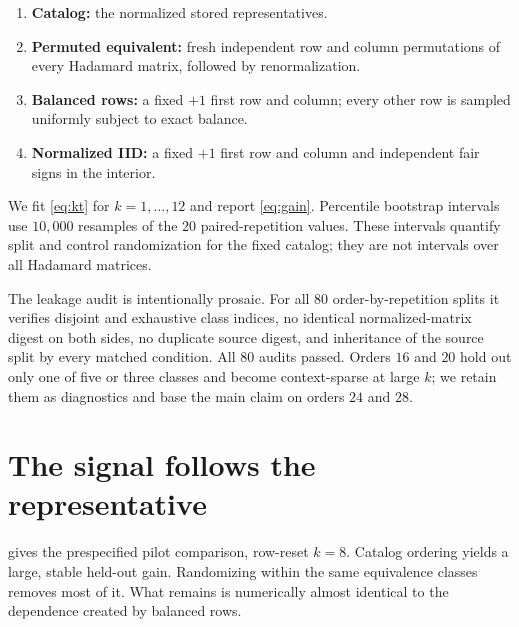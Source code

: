 \documentclass[10pt,twoside]{article}
\theoremstyle{noteplain}
\theoremstyle{definition}
\begin{document}
\begin{enumerate}[label=\textbf{\arabic*.}]
\item \textbf{Catalog:} the normalized stored representatives.
\item \textbf{Permuted equivalent:} fresh independent row and column permutations of every Hadamard matrix, followed by renormalization.
\item \textbf{Balanced rows:} a fixed $+1$ first row and column; every other row is sampled uniformly subject to exact balance.
\item \textbf{Normalized IID:} a fixed $+1$ first row and column and independent fair signs in the interior.
\end{enumerate}

We fit \eqref{eq:kt} for $k=1,\ldots,12$ and report \eqref{eq:gain}.  Percentile bootstrap intervals use $10{,}000$ resamples of the $20$ paired-repetition values.  These intervals quantify split and control randomization for the fixed catalog; they are not intervals over all Hadamard matrices.

The leakage audit is intentionally prosaic.  For all $80$ order-by-repetition splits it verifies disjoint and exhaustive class indices, no identical normalized-matrix digest on both sides, no duplicate source digest, and inheritance of the source split by every matched condition.  All $80$ audits passed.  Orders $16$ and $20$ hold out only one of five or three classes and become context-sparse at large $k$; we retain them as diagnostics and base the main claim on orders $24$ and $28$.

\section{The signal follows the representative}

 gives the prespecified pilot comparison, row-reset $k=8$.  Catalog ordering yields a large, stable held-out gain.  Randomizing within the same equivalence classes removes most of it.  What remains is numerically almost identical to the dependence created by balanced rows.
\end{document}
